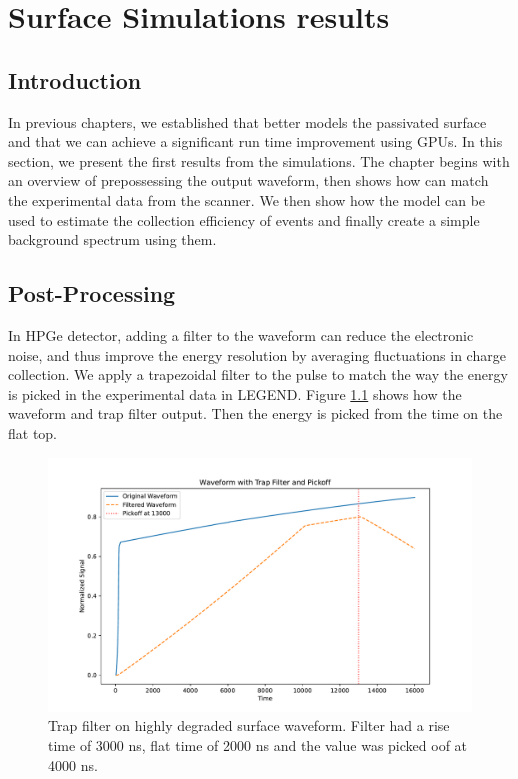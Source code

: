 \chapter{Surface Simulations results}
\label{chap:ehd_res}

\section{Introduction}
In previous chapters, we established that {\ehd} better models the passivated surface and that we can achieve a significant run time improvement using GPUs. In this section, we present the first results from the simulations. The chapter begins with an overview of prepossessing the output waveform, then shows how {\ehd} can match the experimental data from the scanner. We then show how the model can be used to estimate the collection efficiency of {\onbb} events and finally create a simple background spectrum using them.

\section{Post-Processing}

In HPGe detector, adding a filter to the waveform can reduce the electronic noise, and thus improve the energy resolution by averaging fluctuations in charge collection. We apply a trapezoidal filter to the pulse to match the way the energy is picked in the experimental data in LEGEND. Figure \ref{ch5_fig_trap_filter} shows how the waveform and trap filter output. Then the energy is picked from the time on the flat top.

\begin{figure}%
\includegraphics[trim={0cm 0cm 0cm 0cm},clip,width=0.9\linewidth]{ch5/figs/trap_filt.pdf}
\caption{Trap filter on highly degraded surface waveform. Filter had a rise time of 3000 ns, flat time of 2000 ns and the value was picked oof at 4000 ns.}
\label{ch5_fig_trap_filter}
\end{figure}

